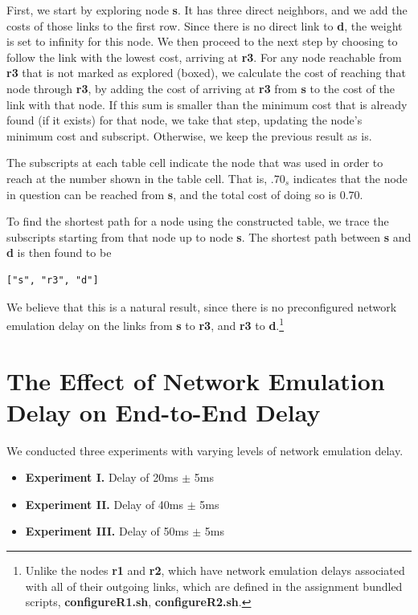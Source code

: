 \documentclass[conference]{IEEEtran}
\begin{document}
First, we start by exploring node \textbf{s}. It has three direct neighbors, and we add the
costs of those links to the first row. Since there is no direct link to \textbf{d}, the weight is set to infinity for
this node. We then
proceed to the next step by choosing to follow the link with the lowest cost, arriving at
\textbf{r3}. For any node reachable from \textbf{r3} that is not marked as explored (boxed), we calculate the cost of
reaching that node through \textbf{r3}, by adding the cost of arriving
at \textbf{r3} from \textbf{s} to the cost of the link with that node. If this sum is
smaller than the minimum cost that is already found (if it exists) for that node, we take that step, updating the node's
minimum cost and subscript. Otherwise, we keep the previous result as is.

The subscripts at each table cell indicate the node that was used in order to reach at the number
shown in the table cell. That is, $.70_{s}$ indicates that the node in question can be reached
from \textbf{s}, and the total cost of doing so is $0.70$.

To find the shortest path for a node using the constructed table, we trace the subscripts starting from that node up to
node \textbf{s}. The shortest path between \textbf{s} and \textbf{d} is then found to be

\begin{lstlisting}
["s", "r3", "d"]
\end{lstlisting}

We believe that this is a natural result, since there is no preconfigured network emulation delay
on the links from \textbf{s} to \textbf{r3}, and \textbf{r3} to \textbf{d}.\footnote{Unlike the
nodes \textbf{r1} and \textbf{r2}, which have network emulation delays associated with all of
their outgoing links, which are defined in the assignment bundled scripts,
\textbf{configureR1.sh}, \textbf{configureR2.sh}.}

\section{The Effect of Network Emulation Delay on End-to-End Delay}

We conducted three experiments with varying levels of network emulation delay.

\begin{itemize}
    \item \textbf{Experiment I.} Delay of 20ms $\pm$ 5ms
    \item \textbf{Experiment II.} Delay of 40ms $\pm$ 5ms
    \item \textbf{Experiment III.} Delay of 50ms $\pm$ 5ms
\end{itemize}
\end{document}
